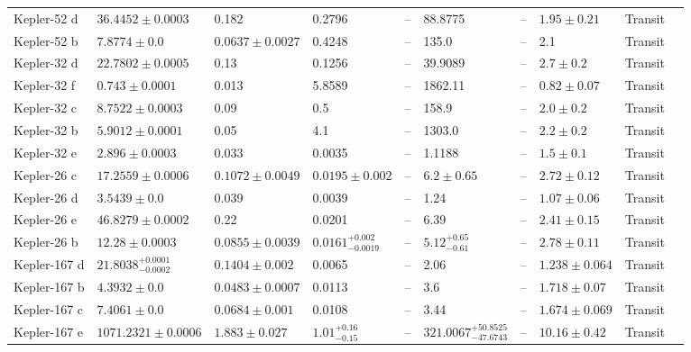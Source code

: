 \begin{tabular}{llllllllll}
Kepler-52 d & $36.4452 \pm 0.0003$ & 0.182 & 0.2796 & -- & 88.8775 & -- & $1.95 \pm 0.21$ & Transit & \cite{ROWE_ET_AL__2014} \\
Kepler-52 b & $7.8774 \pm 0.0$ & $0.0637 \pm 0.0027$ & 0.4248 & -- & 135.0 & -- & 2.1 & Transit & \cite{STEFFEN_ET_AL__2013} \\
Kepler-32 d & $22.7802 \pm 0.0005$ & 0.13 & 0.1256 & -- & 39.9089 & -- & $2.7 \pm 0.2$ & Transit & \cite{FABRYCKY_ET_AL__2012} \\
Kepler-32 f & $0.743 \pm 0.0001$ & 0.013 & 5.8589 & -- & 1862.11 & -- & $0.82 \pm 0.07$ & Transit & \cite{FABRYCKY_ET_AL__2012} \\
Kepler-32 c & $8.7522 \pm 0.0003$ & 0.09 & 0.5 & -- & 158.9 & -- & $2.0 \pm 0.2$ & Transit & \cite{FABRYCKY_ET_AL__2012} \\
Kepler-32 b & $5.9012 \pm 0.0001$ & 0.05 & 4.1 & -- & 1303.0 & -- & $2.2 \pm 0.2$ & Transit & \cite{FABRYCKY_ET_AL__2012} \\
Kepler-32 e & $2.896 \pm 0.0003$ & 0.033 & 0.0035 & -- & 1.1188 & -- & $1.5 \pm 0.1$ & Transit & \cite{FABRYCKY_ET_AL__2012} \\
Kepler-26 c & $17.2559 \pm 0.0006$ & $0.1072 \pm 0.0049$ & $0.0195 \pm 0.002$ & -- & $6.2 \pm 0.65$ & -- & $2.72 \pm 0.12$ & Transit & \cite{JONTOF_HUTTER_ET_AL__2016} \\
Kepler-26 d & $3.5439 \pm 0.0$ & 0.039 & 0.0039 & -- & 1.24 & -- & $1.07 \pm 0.06$ & Transit & \cite{ROWE_ET_AL__2014} \\
Kepler-26 e & $46.8279 \pm 0.0002$ & 0.22 & 0.0201 & -- & 6.39 & -- & $2.41 \pm 0.15$ & Transit & \cite{ROWE_ET_AL__2014} \\
Kepler-26 b & $12.28 \pm 0.0003$ & $0.0855 \pm 0.0039$ & $0.0161^{+0.002}_{-0.0019}$ & -- & $5.12^{+0.65}_{-0.61}$ & -- & $2.78 \pm 0.11$ & Transit & \cite{JONTOF_HUTTER_ET_AL__2016} \\
Kepler-167 d & $21.8038^{+0.0001}_{-0.0002}$ & $0.1404 \pm 0.002$ & 0.0065 & -- & 2.06 & -- & $1.238 \pm 0.064$ & Transit & \cite{CHACHAN_ET_AL__2022} \\
Kepler-167 b & $4.3932 \pm 0.0$ & $0.0483 \pm 0.0007$ & 0.0113 & -- & 3.6 & -- & $1.718 \pm 0.07$ & Transit & \cite{CHACHAN_ET_AL__2022} \\
Kepler-167 c & $7.4061 \pm 0.0$ & $0.0684 \pm 0.001$ & 0.0108 & -- & 3.44 & -- & $1.674 \pm 0.069$ & Transit & \cite{CHACHAN_ET_AL__2022} \\
Kepler-167 e & $1071.2321 \pm 0.0006$ & $1.883 \pm 0.027$ & $1.01^{+0.16}_{-0.15}$ & -- & $321.0067^{+50.8525}_{-47.6743}$ & -- & $10.16 \pm 0.42$ & Transit & \cite{CHACHAN_ET_AL__2022} \\

\end{tabular}
